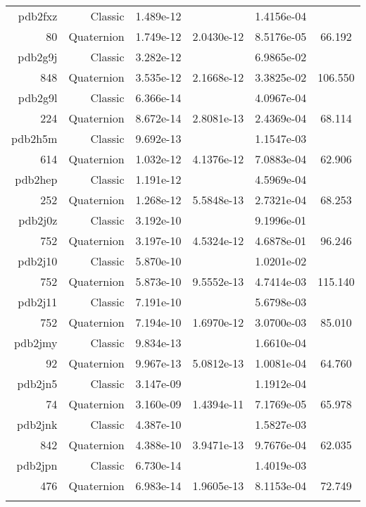 \begin{xltabular}{\textwidth}{r|rS[table-format=1.3e+2]S[table-format=1.4e+2]S[table-format=1.4e+2]S[table-format=-1.3]}
pdb2fxz & Classic & 1.489e-12 &  & 1.4156e-04 & \\
80 & Quaternion & 1.749e-12 & 2.0430e-12 & 8.5176e-05 & 66.192\\  \addlinespace
pdb2g9j & Classic & 3.282e-12 &  & 6.9865e-02 & \\
848 & Quaternion & 3.535e-12 & 2.1668e-12 & 3.3825e-02 & 106.550\\  \addlinespace
pdb2g9l & Classic & 6.366e-14 &  & 4.0967e-04 & \\
224 & Quaternion & 8.672e-14 & 2.8081e-13 & 2.4369e-04 & 68.114\\  \addlinespace
pdb2h5m & Classic & 9.692e-13 &  & 1.1547e-03 & \\
614 & Quaternion & 1.032e-12 & 4.1376e-12 & 7.0883e-04 & 62.906\\  \addlinespace
pdb2hep & Classic & 1.191e-12 &  & 4.5969e-04 & \\
252 & Quaternion & 1.268e-12 & 5.5848e-13 & 2.7321e-04 & 68.253\\  \addlinespace
pdb2j0z & Classic & 3.192e-10 &  & 9.1996e-01 & \\
752 & Quaternion & 3.197e-10 & 4.5324e-12 & 4.6878e-01 & 96.246\\  \addlinespace
pdb2j10 & Classic & 5.870e-10 &  & 1.0201e-02 & \\
752 & Quaternion & 5.873e-10 & 9.5552e-13 & 4.7414e-03 & 115.140\\  \addlinespace
pdb2j11 & Classic & 7.191e-10 &  & 5.6798e-03 & \\
752 & Quaternion & 7.194e-10 & 1.6970e-12 & 3.0700e-03 & 85.010\\  \addlinespace
pdb2jmy & Classic & 9.834e-13 &  & 1.6610e-04 & \\
92 & Quaternion & 9.967e-13 & 5.0812e-13 & 1.0081e-04 & 64.760\\  \addlinespace
pdb2jn5 & Classic & 3.147e-09 &  & 1.1912e-04 & \\
74 & Quaternion & 3.160e-09 & 1.4394e-11 & 7.1769e-05 & 65.978\\  \addlinespace
pdb2jnk & Classic & 4.387e-10 &  & 1.5827e-03 & \\
842 & Quaternion & 4.388e-10 & 3.9471e-13 & 9.7676e-04 & 62.035\\  \addlinespace
pdb2jpn & Classic & 6.730e-14 &  & 1.4019e-03 & \\
476 & Quaternion & 6.983e-14 & 1.9605e-13 & 8.1153e-04 & 72.749\\  \addlinespace

\end{xltabular}
